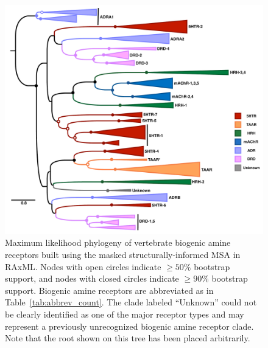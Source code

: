 \documentclass[fleqn,10pt]{wlpeerj}
\begin{document}
\newpage

\begin{figure}[htbp]
	\centerline{\includegraphics[width=18cm]{figures/vert_amine_tree.pdf}}
	\caption{\label{phylogeny} Maximum likelihood phylogeny of vertebrate biogenic amine receptors built using the masked structurally-informed MSA in RAxML. Nodes with open circles indicate $\geq 50\%$ bootstrap support, and nodes with closed circles indicate $\geq 90\%$ bootstrap support. Biogenic amine receptors are abbreviated as in Table~\ref{tab:abbrev_count}. The clade labeled ``Unknown'' could not be clearly identified as one of the major receptor types and may represent a previously unrecognized biogenic amine receptor clade. Note that the root shown on this tree has been placed arbitrarily.}
\end{figure}


\newpage
\end{document}
